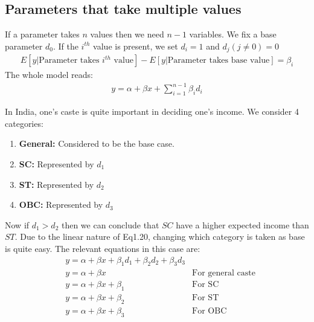 \documentclass[notoc]{tufte-book}
\begin{document}
\subsection{Parameters that take multiple values}
If a parameter takes $n$ values then we need $n-1$ variables. We fix a base parameter $d_0$. If the $i^{th}$ value is present, we set $d_i=1$ and $d_j(j\ne0)=0$
\begin{align}
    E[y|\text{Parameter takes $i^{th}$ value}]-E[y|\text{Parameter takes base value}]=\beta_i
\end{align}
The whole model reads:
\begin{align}
    y=\alpha+\beta x+\sum_{i=1}^{n-1}\beta_id_i
\end{align}
\begin{tcolorbox}[colback=c4,colframe=c3,breakable,title=Example 1.4: Variation of income with caste]
In India, one's caste is quite important in deciding one's income. We consider 4 categories:
\begin{enumerate}
    \item \textbf{General:} Considered to be the base case.
    \item \textbf{SC:} Represented by $d_1$
    \item \textbf{ST:} Represented by $d_2$
    \item \textbf{OBC:} Represented by $d_3$
    
\end{enumerate}
Now if $d_1>d_2$ then we can conclude that $SC$ have a higher expected  income than $ST$. Due to the linear nature of Eq1.20, changing which category is taken as base is quite easy. The relevant equations in this case are:
\begin{align*}
    &y=\alpha+\beta x+\beta_1d_1+\beta_2d_2+\beta_3d_3\\
    &y=\alpha+\beta x\quad&\text{For general caste}\\
    &y=\alpha+\beta x+\beta_1\quad&\text{For SC }\\
    &y=\alpha+\beta x+\beta_2\quad&\text{For ST }\\
    &y=\alpha+\beta x+\beta_3\quad&\text{For OBC}
\end{align*}
\end{tcolorbox}
\end{document}
